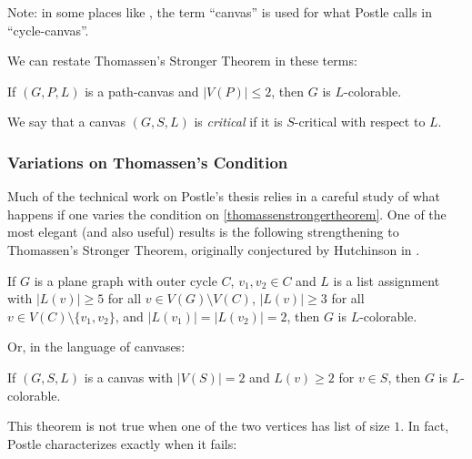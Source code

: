 Note: in some places like \cite{fivelistcoloring2}, the term ``canvas'' is used for what Postle calls in \cite{postlethesis} ``cycle-canvas''.

We can restate Thomassen's Stronger Theorem in these terms:

\begin{theorem}
If $(G, P, L)$ is a path-canvas and $|V(P)| \leq 2$, then $G$ is $L$-colorable.
\end{theorem}

\begin{definition}
We say that a canvas $(G, S, L)$ is \emph{critical} if it is $S$-critical with respect to $L$.
\end{definition}




\subsubsection{Variations on Thomassen's Condition}

Much of the technical work on Postle's thesis relies in a careful study of what happens if one varies the condition on \ref{thomassenstrongertheorem}. One of the most elegant (and also useful) results is the following strengthening to Thomassen's Stronger Theorem, originally conjectured by Hutchinson in \cite{hutchinson2012outerplanar}.

\begin{theorem}
\label{twolistsofsizetwo}
If $G$ is a plane graph with outer cycle $C$, $v_1, v_2 \in C$ and $L$ is a list assignment with $|L(v)| \geq 5$ for all $v \in V(G) \setminus V(C)$, $|L(v)| \geq 3$ for all $v \in V(C) \setminus \{v_1, v_2\}$, and $|L(v_1)| = |L(v_2)| = 2$, then $G$ is $L$-colorable. 
\end{theorem}

Or, in the language of canvases:

\begin{theorem}
If $(G, S, L)$ is a canvas with $|V(S)| = 2$ and $L(v) \geq 2$ for $v \in S$, then $G$ is $L$-colorable.
\end{theorem}

This theorem is not true when one of the two vertices has list of size $1$. In fact, Postle characterizes exactly when it fails:

